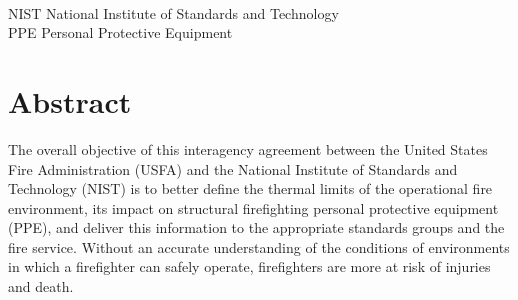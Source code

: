 \documentclass[12pt,oneside]{book}
\begin{document}
\begin{tabbing}
\hspace{1.5in} \= \\
NIST \> National Institute of Standards and Technology \\
PPE \> Personal Protective Equipment \\
\end{tabbing}

\mainmatter

\chapter*{\centering Abstract}
The overall objective of this interagency agreement between the United States Fire Administration (USFA) and the National Institute of Standards and Technology (NIST) is to better define the thermal limits of the operational fire environment, its impact on structural firefighting personal protective equipment (PPE), and deliver this information to the appropriate standards groups and the fire service.  Without an accurate understanding of the conditions of environments in which a firefighter can safely operate, firefighters are more at risk of injuries and death.
\end{document}

